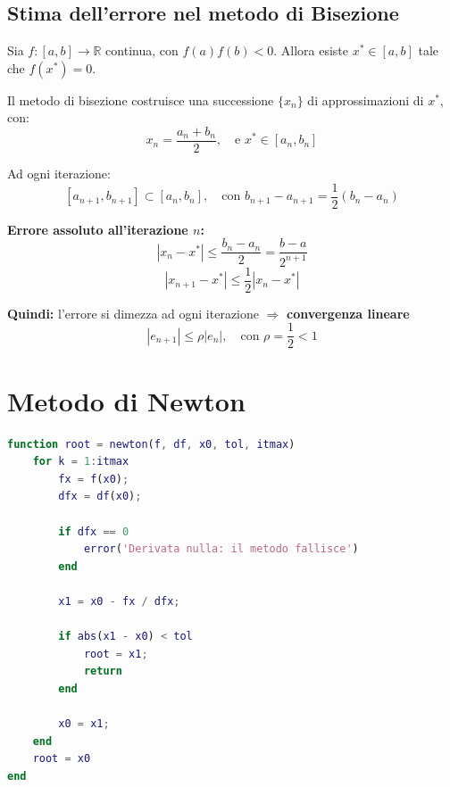 \documentclass[12pt,a4paper]{article}
\begin{document}
\newpage
\subsection*{Stima dell'errore nel metodo di Bisezione}
Sia \(f:[a,b] \to \mathbb{R}\) continua, con \(f(a)f(b) < 0\).  
Allora esiste \(x^* \in [a,b]\) tale che \(f(x^*) = 0\).

Il metodo di bisezione costruisce una successione \(\{x_n\}\) di approssimazioni di \(x^*\), con:
\[
x_n = \frac{a_n + b_n}{2},\quad \text{e } x^* \in [a_n, b_n]
\]

Ad ogni iterazione:
\[
[a_{n+1}, b_{n+1}] \subset [a_n, b_n],\quad \text{con } b_{n+1} - a_{n+1} = \frac{1}{2}(b_n - a_n)
\]

\textbf{Errore assoluto all’iterazione \(n\):}
\[
|x_n - x^*| \leq \frac{b_n - a_n}{2} = \frac{b - a}{2^{n+1}}
\]
\[
|x_{n+1} - x^*| \leq \frac{1}{2} |x_n - x^*|
\]

\textbf{Quindi:} l'errore si dimezza ad ogni iterazione  
\(\Rightarrow\) \textbf{convergenza lineare}
\[
|e_{n+1}| \leq \rho |e_n|,\quad \text{con } \rho = \frac{1}{2} < 1
\]


\newpage
\section*{Metodo di Newton}

\begin{flushleft}
\end{flushleft}

\vspace{1em}
\begin{lstlisting}[language=Matlab]
function root = newton(f, df, x0, tol, itmax)
    for k = 1:itmax
        fx = f(x0);
        dfx = df(x0);
        
        if dfx == 0
            error('Derivata nulla: il metodo fallisce')
        end
        
        x1 = x0 - fx / dfx;
        
        if abs(x1 - x0) < tol
            root = x1;
            return
        end
        
        x0 = x1;
    end
    root = x0
end
\end{lstlisting}
\end{document}
